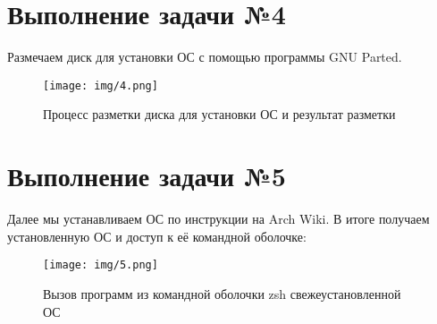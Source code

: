 \documentclass{gost}
\begin{document}
	\section{Выполнение задачи №4}
		Размечаем диск для установки ОС с помощью программы GNU Parted.

		\begin{figure}[H]
			\texttt{[image: img/4.png]}
			\caption{Процесс разметки диска для установки ОС и результат разметки}
		\end{figure}

	\section{Выполнение задачи №5}
		Далее мы устанавливаем ОС по инструкции на Arch Wiki. В итоге получаем
		установленную ОС и доступ к её командной оболочке:

		\begin{figure}[H]
			\texttt{[image: img/5.png]}
			\caption{Вызов программ из командной оболочки zsh свежеустановленной ОС}
		\end{figure}
\end{document}
